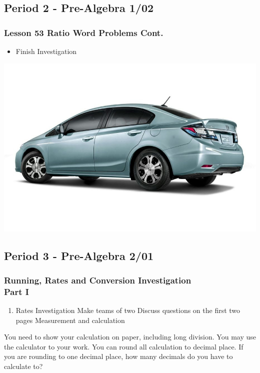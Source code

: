    	  \subsection[PA1/02]{Period 2 - Pre-Algebra 1/02}
   	    \begin{frame}[label=PA1_02]
   	    		\frametitle{Lesson 53 Ratio Word Problems Cont.}

                    \begin{itemize}
                    	\item Finish  Investigation
                    \end{itemize}
                    \vspace{-20pt}
                    \begin{center}
                    	\includegraphics[width=0.5\linewidth]{Images/honda_civic}
                    \end{center}
                    \vspace{-20pt}
   	  \end{frame}

\subsection[PA2/01]{Period 3 - Pre-Algebra 2/01}
   	 \begin{frame}[label=PA2_01]
   	      	\frametitle{Running, Rates and Conversion Investigation \\ Part I}

           \begin{enumerate}
   	        \item Rates Investigation
            \rightarrowitem Make teams of two 
            \rightarrowitem Discuss questions on the first two pages 
            \rightarrowitem Measurement and calculation
           \end{enumerate}

           	\begin{alertblock}{}
           		You need to show your calculation on paper, including long division. You may use the calculator to  your work.
           		You can round all calculation to  decimal place. If you are rounding to one decimal place, how many decimals do you have to calculate to?
           	\end{alertblock}


   	  \end{frame}


